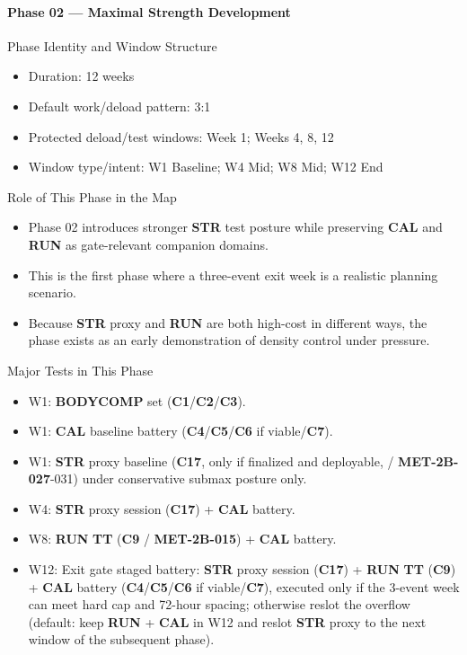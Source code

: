 \documentclass[10pt]{article}
\begin{document}
\newpage
\paragraph*{Phase 02 — Maximal Strength Development}

Phase Identity and Window Structure

\begin{itemize}
\item Duration: 12 weeks
\item Default work/deload pattern: 3:1
\item Protected deload/test windows: Week 1; Weeks 4, 8, 12
\item Window type/intent: W1 Baseline; W4 Mid; W8 Mid; W12 End
\end{itemize}

Role of This Phase in the Map

\begin{itemize}
\item Phase 02 introduces stronger \textbf{STR} test posture while preserving \textbf{CAL} and \textbf{RUN} as gate-relevant companion domains.
\item This is the first phase where a three-event exit week is a realistic planning scenario.
\item Because \textbf{STR} proxy and \textbf{RUN} are both high-cost in different ways, the phase exists as an early demonstration of density control under pressure.
\end{itemize}

Major Tests in This Phase

\begin{itemize}
\item W1: \textbf{BODYCOMP} set (\textbf{C1}/\textbf{C2}/\textbf{C3}).
\item W1: \textbf{CAL} baseline battery (\textbf{C4}/\textbf{C5}/\textbf{C6} if viable/\textbf{C7}).
\item W1: \textbf{STR} proxy baseline (\textbf{C17}, only if finalized and deployable, / \textbf{MET-2B-027}-031) under conservative submax posture only.
\item W4: \textbf{STR} proxy session (\textbf{C17}) + \textbf{CAL} battery.
\item W8: \textbf{RUN} \textbf{TT} (\textbf{C9} / \textbf{MET-2B-015}) + \textbf{CAL} battery.
\item W12: Exit gate staged battery: \textbf{STR} proxy session (\textbf{C17}) + \textbf{RUN} \textbf{TT} (\textbf{C9}) + \textbf{CAL} battery (\textbf{C4}/\textbf{C5}/\textbf{C6} if viable/\textbf{C7}), executed only if the 3-event week can meet hard cap and 72-hour spacing; otherwise reslot the overflow (default: keep \textbf{RUN} + \textbf{CAL} in W12 and reslot \textbf{STR} proxy to the next window of the subsequent phase).
\end{itemize}
\end{document}
